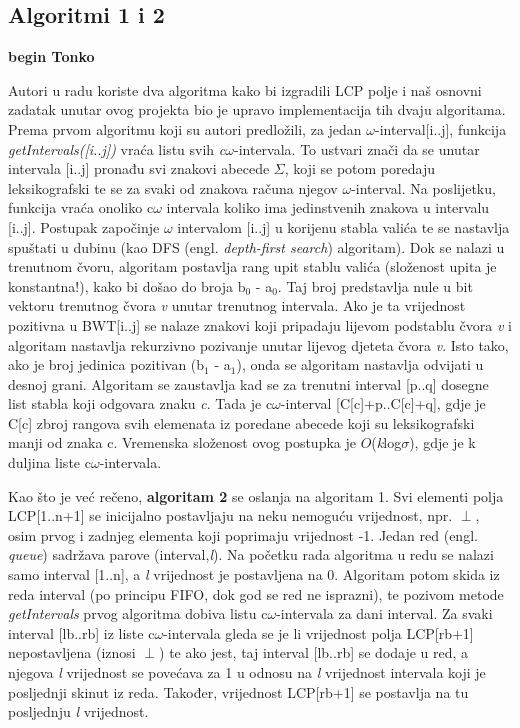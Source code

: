 \documentclass[a4paper,12pt]{article}
\begin{document}

\subsection{Algoritmi 1 i 2}

\textbf{begin Tonko}

Autori u radu \cite{beller2013} koriste dva algoritma kako bi izgradili LCP polje i naš osnovni zadatak unutar ovog projekta bio je upravo implementacija tih dvaju algoritama.
Prema prvom algoritmu koji su autori predložili, za jedan $\omega$-interval[i..j], funkcija \textit{getIntervals([i..j])} vraća listu svih \textit{c$\omega$}-intervala. To ustvari znači da se unutar intervala [i..j] pronađu svi znakovi abecede $\Sigma$, koji se potom poredaju leksikografski te se za svaki od znakova računa njegov $\omega$-interval. Na poslijetku, funkcija vraća onoliko c$\omega$ intervala koliko ima jedinstvenih znakova u intervalu [i..j].
Postupak započinje $\omega$ intervalom [i..j] u korijenu stabla valića te se nastavlja spuštati u dubinu (kao DFS (engl. \textit{depth-first search}) algoritam).
Dok se nalazi u trenutnom čvoru, algoritam postavlja rang upit stablu valića (složenost upita je konstantna!), kako bi došao do broja b$_{0}$ - a$_{0}$. Taj broj predstavlja nule u bit vektoru trenutnog čvora \textit{v} unutar trenutnog intervala. Ako je ta vrijednost pozitivna u BWT[i..j] se nalaze znakovi koji pripadaju lijevom podstablu čvora \textit{v} i algoritam nastavlja rekurzivno pozivanje unutar lijevog djeteta čvora \textit{v}. Isto tako, ako je broj jedinica pozitivan (b$_1$ - a$_1$), onda se algoritam nastavlja odvijati u desnoj grani. Algoritam se zaustavlja kad se za trenutni interval [p..q] dosegne list stabla koji odgovara znaku \textit{c}. Tada je c$\omega$-interval [C[c]+p..C[c]+q], gdje je C[c] zbroj rangova svih elemenata iz poredane abecede koji su leksikografski manji od znaka c. Vremenska složenost ovog postupka je $O$(\textit{k}log$\sigma$), gdje je k duljina liste c$\omega$-intervala.

Kao što je već rečeno, \textbf{algoritam 2} se oslanja na algoritam 1. Svi elementi polja LCP[1..n+1] se inicijalno postavljaju na neku nemoguću vrijednost, npr. $\perp$, osim prvog i zadnjeg elementa koji poprimaju vrijednost -1. Jedan red (engl. \textit{queue}) sadržava parove (interval,\textit{l}). Na početku rada algoritma u redu se nalazi samo interval [1..n], a \textit{l} vrijednost je postavljena na 0. Algoritam potom skida iz reda interval (po principu FIFO, dok god se red ne isprazni), te pozivom metode \textit{getIntervals} prvog algoritma dobiva listu c$\omega$-intervala za dani interval. Za svaki interval [lb..rb] iz liste c$\omega$-intervala gleda se je li vrijednost polja LCP[rb+1] nepostavljena (iznosi $\perp$) te ako jest, taj interval [lb..rb] se dodaje u red, a njegova \textit{l} vrijednost se povećava za 1 u odnosu na \textit{l} vrijednost intervala koji je posljednji skinut iz reda. Također, vrijednost LCP[rb+1] se postavlja na tu posljednju \textit{l} vrijednost. 
\end{document}
